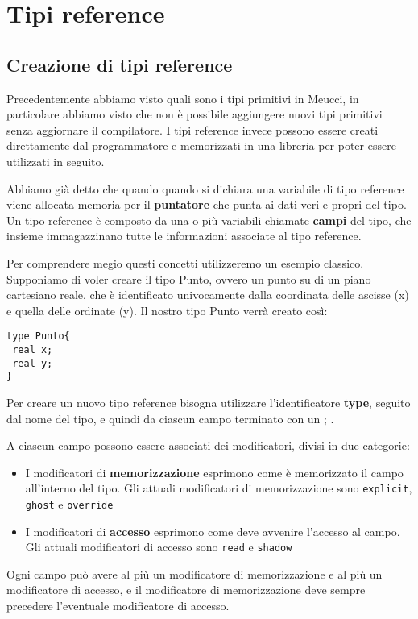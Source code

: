 \documentclass[10pt]{book}%
\newcommand{\e}{\`{e} }
\newcommand{\ac}[1]{\`{#1}}
\newcommand{\code}[1]{\texttt{#1}}
\renewcommand{\emph}[1]{\textbf{#1}}
\newenvironment{codeenv}{
\begin{mdframed}[backgroundcolor=black!20,topline=false,leftline=false,rightline=false,bottomline=false]
}
{\end{mdframed}}
\begin{document}
\chapter{Tipi reference}
\section{Creazione di tipi reference}
Precedentemente abbiamo visto quali sono i tipi primitivi in Meucci, in particolare abbiamo visto che non \e possibile aggiungere nuovi tipi primitivi senza aggiornare il compilatore. I tipi reference invece possono essere creati direttamente dal programmatore e memorizzati in una libreria per poter essere utilizzati in seguito.

Abbiamo gi\ac a detto che quando quando si dichiara una variabile di tipo reference viene allocata memoria per il \emph{puntatore} che punta ai dati veri e propri del tipo. Un tipo reference \e composto da una o pi\ac u variabili chiamate \emph{campi} del tipo, che insieme immagazzinano tutte le informazioni associate al tipo reference.

Per comprendere megio questi concetti utilizzeremo un esempio classico. Supponiamo di voler creare il tipo Punto, ovvero un punto su di un piano cartesiano reale, che \e identificato univocamente dalla coordinata delle ascisse (x) e quella delle ordinate (y). Il nostro tipo Punto verr\ac a creato cos\ac i:
\begin{codeenv}
\begin{verbatim}
type Punto{
 real x;
 real y;
}
\end{verbatim}
\end{codeenv}
Per creare un nuovo tipo reference bisogna utilizzare l'identificatore \emph{type}, seguito dal nome del tipo, e quindi da ciascun campo terminato con un ; .

A ciascun campo possono essere associati dei modificatori, divisi in due categorie:
\begin{itemize}
\item I modificatori di \emph{memorizzazione} esprimono come \e memorizzato il campo all'interno del tipo. Gli attuali modificatori di memorizzazione sono \code{explicit}, \code{ghost} e \code{override}
\item I modificatori di \emph{accesso} esprimono come deve avvenire l'accesso al campo. Gli attuali modificatori di accesso sono \code{read} e \code{shadow}
\end{itemize}
Ogni campo pu\ac o avere al pi\ac u un modificatore di memorizzazione e al pi\ac u un modificatore di accesso, e il modificatore di memorizzazione deve sempre precedere l'eventuale modificatore di accesso.
\end{document}
